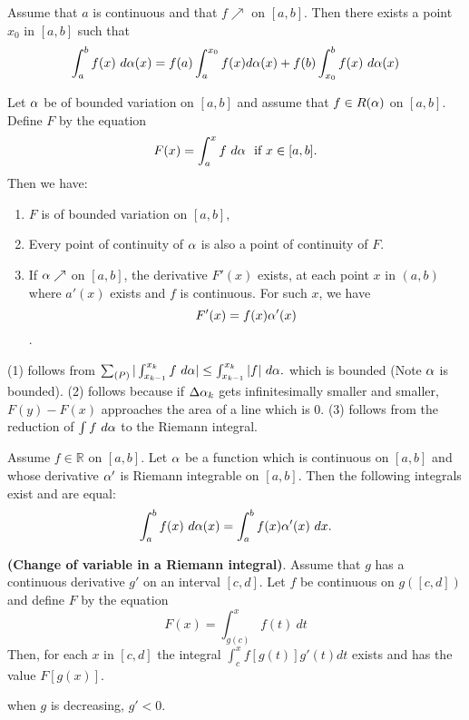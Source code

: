 \documentclass[10pt,a4paper]{book}
\begin{document}
\begin{Thm}
Assume that $a$ is continuous and that $f \nearrow$ on $[a, b]$. Then there exists a point $x_0$ in $[a, b]$ such that
    $$\int_a^b f(x)\ \da(x) = f(a)\int_a^{x_0} f(x) \da(x) + f(b)\int_{x_0}^b f(x)\ \da(x)$$
\end{Thm}
\begin{Thm}
Let $\alpha$ be of bounded variation on $[a, b]$ and assume that $f \in R(\alpha)$ on $[a, b]$. Define $F$ by the equation
$$F(x) = \int_a^x f\ \da \ \text{  if } x \in [a,b].$$
Then we have:
\begin{enumerate}
    \item $F$ is of bounded variation on $[a,b],$
    \item Every point of continuity of $\alpha$ is also a point of continuity of $F$.
    \item If $\alpha \nearrow$ on $[a,b]$, the derivative $F'(x)$ exists, at each point $x$ in $(a,b)$ where $a'(x)$ exists and $f$ is continuous. For such $x$, we have
    $$F'(x) = f(x)\alpha'(x)$$.
\end{enumerate}
\end{Thm}

\PP (1) follows from $\sum_{(P)} |\int_{x_{k-1}}^{x_k} f \ \da | \leq \int_{x_{k-1}}^{x_k} |f| \ \da.$ which is bounded (Note $\alpha$ is bounded). (2) follows because if $\Delta \alpha_k$ gets infinitesimally smaller and smaller, $F(y)- F(x)$ approaches the area of a line which is 0. (3) follows from the reduction of $\int f \ d \alpha$ to the Riemann integral.

\begin{Thm}
Assume $f \in \mathbb{R}$ on $[a, b]$. Let $\alpha$ be a function which is continuous on
$[a, b]$ and whose derivative $\alpha'$ is Riemann integrable on $[a, b]$. Then the following integrals exist and are equal:
$$\int_a^b f(x) \ \da(x) = \int_a^b f(x) \al'(x) \ dx.$$

\end{Thm}

\begin{Thm}
 \textbf{(Change of variable in a Riemann integral)}. Assume that $g$ has a
continuous derivative $g'$ on an interval $[c, d]$. Let $f$ be continuous on $g([c, d])$ and define $F$ by the equation
$$F(x) = \int_{g(c)}^x f(t) \ dt$$
Then, for each $x$ in $[c, d]$ the integral $\int_c^x f[g(t)]g'(t) dt$ exists and has the value $F[g(x)]$. 

\end{Thm}
\PP when $g$ is decreasing, $g' < 0$.
\end{document}
